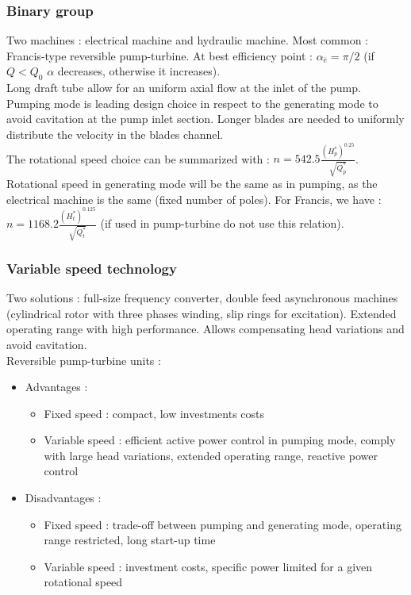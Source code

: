 \documentclass[../main.tex]{subfiles}
\begin{document}
\subsubsection{Binary group}
Two machines : electrical machine and hydraulic machine. Most common : Francis-type reversible pump-turbine. At best efficiency point : $\alpha_{\overline{e}} = \pi/2$ (if $Q<Q_0$ $\alpha$ decreases, otherwise it increases). \\
Long draft tube allow for an uniform axial flow at the inlet of the pump. Pumping mode is leading design choice in respect to the generating mode to avoid cavitation at the pump inlet section. Longer blades are needed to uniformly distribute the velocity in the blades channel.\\
The rotational speed choice can be summarized with : $n = 542.5 \frac{(H_p^*)^{0.25}}{\sqrt{Q_p^*}}$. Rotational speed in generating mode will be the same as in pumping, as the electrical machine is the same (fixed number of poles). For Francis, we have : $n = 1168.2 \frac{(H_t^*)^{0.125}}{\sqrt{Q_t^*}}$ (if used in pump-turbine do not use this relation).\\

\subsubsection{Variable speed technology}
Two solutions : full-size frequency converter, double feed asynchronous machines (cylindrical rotor with three phases winding, slip rings for excitation). Extended operating range with high performance. Allows compensating head variations and avoid cavitation.\\
Reversible pump-turbine units : 
\begin{itemize}
    \item Advantages : \begin{itemize}
        \item Fixed speed : compact, low investments costs
        \item Variable speed : efficient active power control in pumping mode, comply with large head variations, extended operating range, reactive power control
    \end{itemize}
    \item Disadvantages : \begin{itemize}
        \item Fixed speed : trade-off between pumping and generating mode, operating range restricted, long start-up time
        \item Variable speed : investment costs, specific power limited for a given rotational speed
    \end{itemize}
\end{itemize}
\end{document}
